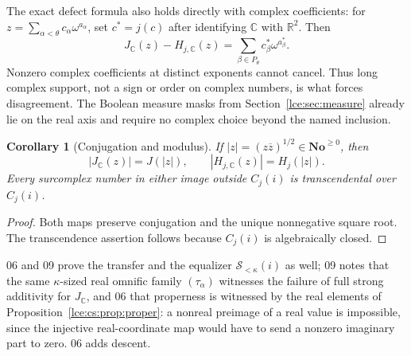\documentclass[11pt,letterpaper]{article}
\numberwithin{equation}{section}
\newtheorem{corollary}[theorem]{Corollary}
\theoremstyle{definition}
\theoremstyle{remark}
\newcommand{\No}{\mathbf{No}}
\newcommand{\R}{\mathbb R}
\newcommand{\C}{\mathbb C}
\newcommand{\Sk}{\mathscr S_{<\kappa}}
\newcommand{\Common}{C_j}
\newcommand{\Jc}{J_{\C}}
\newcommand{\Hc}{H_{j,\C}}
\newcommand{\prref}[1]{Proposition~\ref{#1}}
\begin{document}
The exact defect formula also holds directly with complex coefficients:
for $z=\sum_{\alpha<\theta}c_\alpha\omega^{a_\alpha}$, set
$c^*=j(c)$ after identifying $\C$ with $\R^2$. Then
\[
 \Jc(z)-\Hc(z)=
   \sum_{\beta\in P_\theta}c^*_\beta\omega^{a^*_\beta}.
\]
Nonzero complex coefficients at distinct exponents cannot cancel. Thus
long complex support, not a sign or order on complex numbers, is what
forces disagreement. The Boolean measure masks from
Section~\ref{lce:sec:measure} already lie on the real axis and require no
complex choice beyond the named inclusion.

\begin{corollary}[Conjugation and modulus]\label{lce:cor:modulus}
If $|z|=(z\overline z)^{1/2}\in\No^{\ge0}$, then
\[
 |\Jc(z)|=J(|z|),\qquad |\Hc(z)|=H_j(|z|).
\]
Every surcomplex number in either image outside $\Common(i)$ is
transcendental over $\Common(i)$.
\end{corollary}
\begin{proof}
Both maps preserve conjugation and the unique nonnegative square root.
The transcendence assertion follows because $\Common(i)$ is algebraically
closed.
\end{proof}

06 and 09 prove the transfer and the equalizer $\Sk(i)$ as well; 09 notes
that the same $\kappa$-sized real omnific family $(\tau_\alpha)$ witnesses the
failure of full strong additivity for $\Jc$, and 06 that properness is
witnessed by the real elements of \prref{lce:cs:prop:proper}: a nonreal
preimage of a real value is impossible, since the injective real-coordinate
map would have to send a nonzero imaginary part to zero. 06 adds descent.
\end{document}
